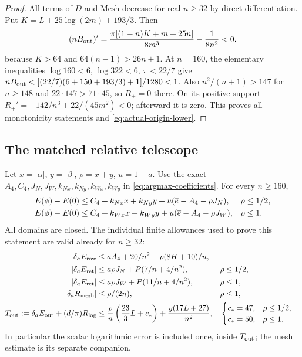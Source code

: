 \begin{proof}
All terms of $D$ and $\mathrm{Mesh}$ decrease for real $n\geq32$
by direct differentiation. Put $K=L+25\log(2m)+193/3$.
Then
\[
 (nB_{\rm out})'=
 \frac{\pi[(1-n)K+m+25n]}{8m^3}-\frac1{8n^2}<0,
\]
because $K>64$ and $64(n-1)>26n+1$. At $n=160$, the elementary
inequalities $\log160<6$, $\log322<6$, $\pi<22/7$ give
$nB_{\rm out}<[(22/7)(6+150+193/3)+1]/1280<1$.
Also $n^2/(n+1)>147$ for $n\geq148$ and $22\cdot147>71\cdot45$,
so $R_+=0$ there. On its positive support
$R_+'=-142/n^3+22/(45m^2)<0$; afterward it is zero.
This proves all monotonicity statements and \eqref{eq:actual-origin-lower}.
\end{proof}

\subsection{The matched relative telescope}

\begin{lemma}\label{lem:relative-telescope}
Let $x=|\alpha|$, $y=|\beta|$, $\rho=x+y$, $u=1-a$. Use the exact
$A_4,C_4,J_N,J_W,k_{Nx},k_{Ny},k_{Wx},k_{Wy}$ in
\eqref{eq:argmax-coefficients}. For every $n\geq160$,
\begin{align}\label{eq:complete-relative-bound}
 E(\phi)-E(0)&\leq C_4+k_{Nx}x+k_{Ny}y
             +u(\overline e-A_4-\rho J_N),&&\rho\leq1/2,\\
 E(\phi)-E(0)&\leq C_4+k_{Wx}x+k_{Wy}y
             +u(\overline e-A_4-\rho J_W),&&\rho\leq1.\notag
\end{align}
All domains are closed. The individual finite allowances used to prove
this statement are valid already for $n\geq32$:
\begin{align}\label{eq:relative-components}
 \delta_aE_{\rm row}&\leq aA_4+20/n^2+\rho(8H+10)/n,\\
 |\delta_aE_{\rm ret}|&\leq
  a\rho J_N+P(7/n+4/n^2),&&\rho\leq1/2,\notag\\
 |\delta_aE_{\rm ret}|&\leq
  a\rho J_W+P(11/n+4/n^2),&&\rho\leq1,\notag\\
 |\delta_aR_{\rm mesh}|&\leq\rho/(2n),&&\rho\leq1,\notag\\
 T_{\rm out}:=\delta_aE_{\rm out}+(d/\pi)R_{\log}
 &\leq\frac\rho n\left(\frac{23}3L+c_*\right)
                      +\frac{y(17L+27)}{n^2},
 &&\begin{cases}c_*=47,&\rho\leq1/2,\\c_*=50,&\rho\leq1.
 \end{cases}\notag
\end{align}
In particular the scalar logarithmic error is included once, inside
$T_{\rm out}$; the mesh estimate is its separate companion.
\end{lemma}

